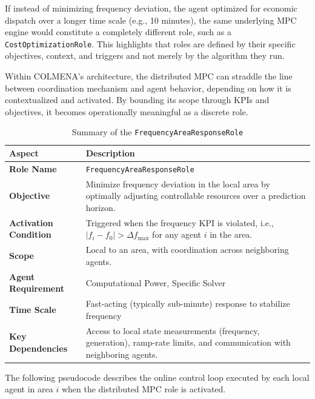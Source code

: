 \documentclass{article}
\begin{document}
If instead of minimizing frequency deviation, the agent optimized for economic dispatch over a longer time scale (e.g., 10 minutes), the same underlying MPC engine would constitute a completely different role, such as a \texttt{CostOptimizationRole}. This highlights that roles are defined by their specific objectives, context, and triggers and not merely by the algorithm they run.

Within COLMENA's architecture, the distributed MPC can straddle the line between coordination mechanism and agent behavior, depending on how it is contextualized and activated. By bounding its scope through KPIs and objectives, it becomes operationally meaningful as a discrete role.

\begin{table}[h!]
\centering
\begin{tabular}{|p{4cm}|p{10cm}|}
\hline
\textbf{Aspect} & \textbf{Description} \\
\hline
\textbf{Role Name} & \texttt{FrequencyAreaResponseRole} \\
\hline
\textbf{Objective} & Minimize frequency deviation in the local area by optimally adjusting controllable resources over a prediction horizon. \\
\hline
\textbf{Activation Condition} & Triggered when the frequency KPI is violated, i.e., $|f_i - f_0| > \Delta f_{\text{max}}$ for any agent $i$ in the area. \\
\hline
\textbf{Scope} & Local to an area, with coordination across neighboring agents. \\
\hline
\textbf{Agent Requirement} & Computational Power, Specific Solver\\
\hline
\textbf{Time Scale} & Fast-acting (typically sub-minute) response to stabilize frequency\\
\hline
\textbf{Key Dependencies} & Access to local state measurements (frequency, generation), ramp-rate limits, and communication with neighboring agents. \\
\hline
\end{tabular}
\caption{Summary of the \texttt{FrequencyAreaResponseRole}}
\end{table}

The following pseudocode describes the online control loop executed by each local agent in area $i$ when the distributed MPC role is activated.
\end{document}

